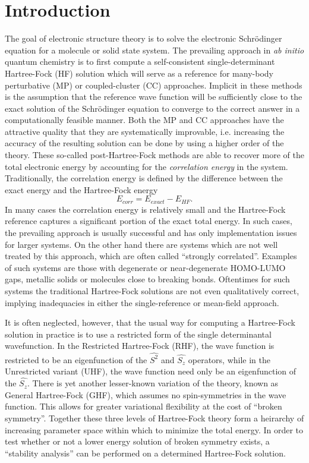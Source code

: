 \documentclass[preprint, journal=prl]{revtex4-1}
\begin{document}
\section{Introduction}
  The goal of electronic structure theory is to solve the electronic Schr{\"o}dinger equation  for a molecule or solid state system. The prevailing approach in \emph{ab initio} quantum  chemistry is to first compute a self-consistent single-determinant Hartree-Fock (HF) solution which will serve as a reference for many-body perturbative (MP) or coupled-cluster (CC) approaches. Implicit in these methods is the assumption that the reference wave function will be sufficiently close to the exact solution of the Schr{\"o}dinger equation to converge to the correct answer in a computationally feasible manner. Both the MP and CC approaches have the attractive quality that they are systematically improvable, i.e. increasing the accuracy of the resulting solution can be done by using a higher order of the theory. These so-called post-Hartree-Fock methods are able to recover more of the total electronic energy by accounting for the \emph{correlation energy} in the system. Traditionally, the correlation energy is defined by the difference between the exact energy and the Hartree-Fock energy \cite{Shavitt2009}
  \begin{equation}\label{eq:correlation_energy}
    E_{corr} = E_{exact} -  E_{HF}.
  \end{equation}
  In many cases the correlation energy is relatively small and the Hartree-Fock reference captures a significant portion of the exact total energy. In such cases, the prevailing approach is usually successful and has only implementation issues for larger systems. On the other hand there are systems which are not well treated by this approach, which are often called ``strongly correlated''. Examples of such systems are those with degenerate or near-degenerate HOMO-LUMO gaps, metallic solids or molecules close to breaking bonds. Oftentimes for such systems the traditional Hartree-Fock solutions are not even qualitatively correct, implying inadequacies in either the single-reference or mean-field approach.    
  
  It is often neglected, however, that the usual way for computing a Hartree-Fock solution in practice is to use a restricted form of the single determinantal wavefunction. In the Restricted  Hartree-Fock (RHF), the wave function is restricted to be an eigenfunction of the $\hat{S^2}$ and $\hat{S_z}$ operators, while in the Unrestricted variant (UHF), the wave function need only be an eigenfunction of the $\hat{S_z}$. There is yet another lesser-known variation of the theory, known as General Hartree-Fock (GHF), which assumes no spin-symmetries in the wave function. This allows for greater variational flexibility at the cost of ``broken symmetry''. Together these three levels of Hartree-Fock theory form a heirarchy of increasing parameter space within which to minimize the total energy. In order to test whether or not a lower energy solution of broken symmetry exists, a ``stability analysis'' can be performed on a determined Hartree-Fock solution. 
  
\end{document}

